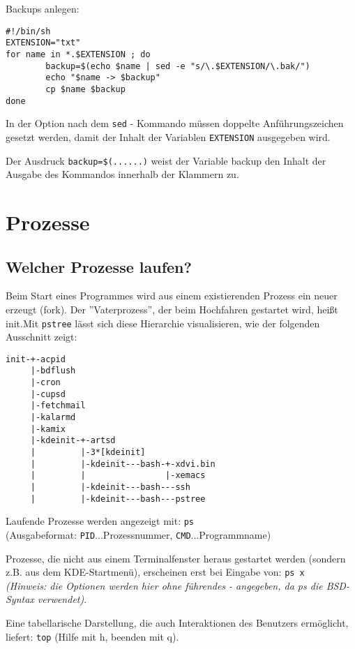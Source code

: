 \documentclass[11pt]{article}
\begin{document}
Backups anlegen:
\begin{verbatim}
#!/bin/sh
EXTENSION="txt"
for name in *.$EXTENSION ; do
        backup=$(echo $name | sed -e "s/\.$EXTENSION/\.bak/")
        echo "$name -> $backup"
        cp $name $backup
done
\end{verbatim}

In der Option nach dem \texttt{sed} - Kommando müssen doppelte Anführungszeichen gesetzt werden, damit der Inhalt der Variablen \texttt{EXTENSION} ausgegeben wird.

Der Ausdruck \texttt{backup=\$(......)} weist der Variable backup den Inhalt der Ausgabe des Kommandos innerhalb der Klammern zu.



\section{Prozesse}
\subsection{Welcher Prozesse laufen?}
Beim Start eines Programmes wird aus einem existierenden Prozess ein
neuer erzeugt (fork). Der ''Vaterprozess'', der beim Hochfahren
gestartet wird, heißt init.Mit \texttt{pstree} lässt sich diese
Hierarchie visualisieren, wie der folgenden Ausschnitt zeigt:
\begin{samepage}
\begin{verbatim}
init-+-acpid
     |-bdflush
     |-cron
     |-cupsd
     |-fetchmail
     |-kalarmd
     |-kamix
     |-kdeinit-+-artsd
     |         |-3*[kdeinit]
     |         |-kdeinit---bash-+-xdvi.bin
     |         |                |-xemacs
     |         |-kdeinit---bash---ssh
     |         |-kdeinit---bash---pstree
\end{verbatim}
\end{samepage}

Laufende Prozesse werden angezeigt mit: 
\texttt{ps}\\
(Ausgabeformat: \texttt{PID}...Prozessnummer, \texttt{CMD}...Programmname)

Prozesse, die nicht aus einem Terminalfenster heraus gestartet werden
(sondern z.B. aus dem KDE-Startmenü), erscheinen erst bei Eingabe von:
\texttt{ps x}\\
\textit{(Hinweis: die Optionen werden hier ohne führendes - angegeben,
  da ps die BSD-Syntax verwendet)}.

Eine tabellarische Darstellung, die auch Interaktionen des Benutzers
ermöglicht, liefert:
\texttt{top} 
(Hilfe mit h, beenden mit q).
\end{document}
